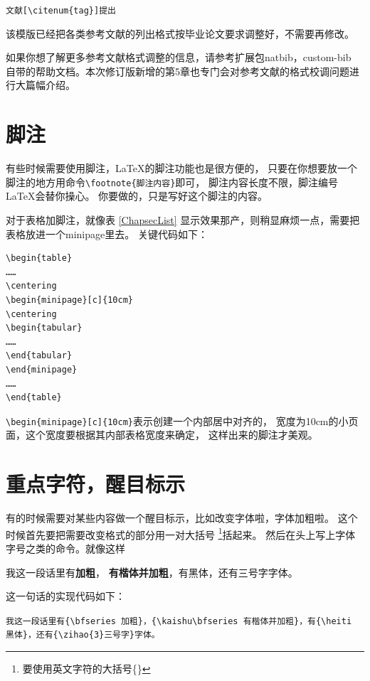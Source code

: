 {\noindent{}\verb+文献[\citenum{tag}]提出+}

该模版已经把各类参考文献的列出格式按毕业论文要求调整好，不需要再修改。

如果你想了解更多参考文献格式调整的信息，请参考扩展包natbib，custom-bib
自带的帮助文档。本次修订版新增的第5章也专门会对参考文献的格式校调问题进行大篇幅介绍。

\section{脚注}

有些时候需要使用脚注，\LaTeX 的脚注功能也是很方便的，
只要在你想要放一个脚注的地方用命令\verb+\footnote{脚注内容}+即可，
脚注内容长度不限，脚注编号\LaTeX 会替你操心。
你要做的，只是写好这个脚注的内容。

对于表格加脚注，就像表 \ref{ChapsecList} 显示效果那产，则稍显麻烦一点，需要把表格放进一个minipage里去。
关键代码如下：

{
\linespread{1}
\noindent
\begin{verbatim}
\begin{table}
……
\centering
\begin{minipage}[c]{10cm}
\centering
\begin{tabular}
……
\end{tabular}
\end{minipage}
……
\end{table}
\end{verbatim}
}

\verb+\begin{minipage}[c]{10cm}+表示创建一个内部居中对齐的，
宽度为10cm的小页面，这个宽度要根据其内部表格宽度来确定，
这样出来的脚注才美观。

\section{重点字符，醒目标示}

有的时候需要对某些内容做一个醒目标示，比如改变字体啦，字体加粗啦。
这个时候首先要把需要改变格式的部分用一对大括号
\footnote{要使用英文字符的大括号\{\}}括起来。
然后在头上写上字体字号之类的命令。就像这样

我这一段话里有{\bfseries 加粗}，
{\kaishu\bfseries 有楷体并加粗}，有{\heiti 黑体}，还有{三号字}字体。

这一句话的实现代码如下：

{
\linespread{1}
\noindent
\verb+我这一段话里有{\bfseries 加粗}，{\kaishu\bfseries 有楷体并加粗}，有{\heiti 黑体}，还有{\zihao{3}三号字}字体。+
}

